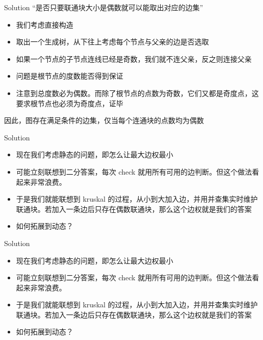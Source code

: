 ﻿\documentclass[aspectratio=169,handout]{ctexbeamer}
\begin{document}
\begin{frame}{Solution}
    “是否只要联通块大小是偶数就可以能取出对应的边集”
    \begin{itemize}
        \item 我们考虑直接构造
        \item 取出一个生成树，从下往上考虑每个节点与父亲的边是否选取
        \item 如果一个节点的子节点连线已经是奇数，我们就不连父亲，反之则连接父亲
        \item 问题是根节点的度数能否得到保证
        \item 注意到总度数必为偶数。而除了根节点的点数为奇数，它们又都是奇度点，这要求根节点也必须为奇度点，证毕
    \end{itemize}
    因此，图存在满足条件的边集，仅当每个连通块的点数均为偶数
\end{frame}

\begin{frame}{Solution}
    \begin{itemize}
        \item 现在我们考虑静态的问题，即怎么让最大边权最小
        \item 可能立刻联想到二分答案，每次 check 就用所有可用的边判断。但这个做法看起来非常浪费。
        \item 于是我们就能联想到 kruskal 的过程，从小到大加入边，并用并查集实时维护联通块。若加入一条边后只存在偶数联通块，那么这个边权就是我们的答案
        \item 如何拓展到动态？
    \end{itemize}
\end{frame}

\begin{frame}{Solution}
    \begin{itemize}
        \item 现在我们考虑静态的问题，即怎么让最大边权最小
        \item 可能立刻联想到二分答案，每次 check 就用所有可用的边判断。但这个做法看起来非常浪费。
        \item 于是我们就能联想到 kruskal 的过程，从小到大加入边，并用并查集实时维护联通块。若加入一条边后只存在偶数联通块，那么这个边权就是我们的答案
        \item 如何拓展到动态？
    \end{itemize}
\end{frame}
\end{document}
